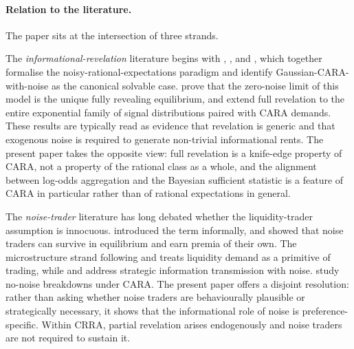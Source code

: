 \documentclass[12pt,letterpaper]{article}
\theoremstyle{definition}
\theoremstyle{remark}
\newcommand{\1}{\mathbf{1}}
\begin{document}
\paragraph{Relation to the literature.}
The paper sits at the intersection of three strands.

The \emph{informational-revelation} literature begins with
\citet{GrossmanStiglitz1980}, \citet{Hellwig1980}, and
\citet{DiamondVerrecchia1981}, which together formalise the
noisy-rational-expectations paradigm and identify Gaussian-CARA-with-noise
as the canonical solvable case. \citet{DeMarzoSkiadas1998} prove that the
zero-noise limit of this model is the unique fully revealing equilibrium,
and \citet{BreonDrish2015} extend full revelation to the entire
exponential family of signal distributions paired with CARA demands. These
results are typically read as evidence that revelation is generic and
that exogenous noise is required to generate non-trivial informational
rents. The present paper takes the opposite view: full revelation is a
knife-edge property of CARA, not a property of the rational class as a
whole, and the alignment between log-odds aggregation and the Bayesian
sufficient statistic is a feature of CARA in particular rather than of
rational expectations in general.

The \emph{noise-trader} literature has long debated whether the
liquidity-trader assumption is innocuous. \citet{Black1986} introduced
the term informally, and \citet{DSSW1990} showed that noise traders can
survive in equilibrium and earn premia of their own. The microstructure
strand following \citet{Kyle1985} and \citet{GlostenMilgrom1985} treats
liquidity demand as a primitive of trading, while
\citet{Kyle1989} and \citet{SpiegelSubrahmanyam1992} address strategic
information transmission with noise. \citet{BhattacharyaSpiegel1991}
study no-noise breakdowns under CARA. The present paper offers a
disjoint resolution: rather than asking whether noise traders are
behaviourally plausible or strategically necessary, it shows that the
informational role of noise is preference-specific. Within CRRA, partial
revelation arises endogenously and noise traders are not required to
sustain it.
\end{document}
